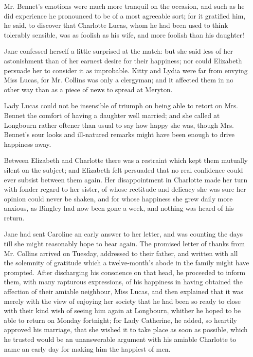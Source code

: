 \documentclass[12pt,openright]{book}
\begin{document}
Mr. Bennet’s emotions were much more tranquil on the occasion, and such as he did experience he pronounced to be of a most agreeable sort; for it gratified him, he said, to discover that Charlotte Lucas, whom he had been used to think tolerably sensible, was as foolish as his wife, and more foolish than his daughter!

Jane confessed herself a little surprised at the match: but she said less of her astonishment than of her earnest desire for their happiness; nor could Elizabeth persuade her to consider it as improbable. Kitty and Lydia were far from envying Miss Lucas, for Mr. Collins was only a clergyman; and it affected them in no other way than as a piece of news to spread at Meryton.

Lady Lucas could not be insensible of triumph on being able to retort on Mrs. Bennet the comfort of having a daughter well married; and she called at Longbourn rather oftener than usual to say how happy she was, though Mrs. Bennet’s sour looks and ill-natured remarks might have been enough to drive happiness away.

Between Elizabeth and Charlotte there was a restraint which kept them mutually silent on the subject; and Elizabeth felt persuaded that no real confidence could ever subsist between them again. Her disappointment in Charlotte made her turn with fonder regard to her sister, of whose rectitude and delicacy she was sure her opinion could never be shaken, and for whose happiness she grew daily more anxious, as Bingley had now been gone a week, and nothing was heard of his return.

Jane had sent Caroline an early answer to her letter, and was counting the days till she might reasonably hope to hear again. The promised letter of thanks from Mr. Collins arrived on Tuesday, addressed to their father, and written with all the solemnity of gratitude which a twelve-month’s abode in the family might have prompted. After discharging his conscience on that head, he proceeded to inform them, with many rapturous expressions, of his happiness in having obtained the affection of their amiable neighbour, Miss Lucas, and then explained that it was merely with the view of enjoying her society that he had been so ready to close with their kind wish of seeing him again at Longbourn, whither he hoped to be able to return on Monday fortnight; for Lady Catherine, he added, so heartily approved his marriage, that she wished it to take place as soon as possible, which he trusted would be an unanswerable argument with his amiable Charlotte to name an early day for making him the happiest of men.
\end{document}
